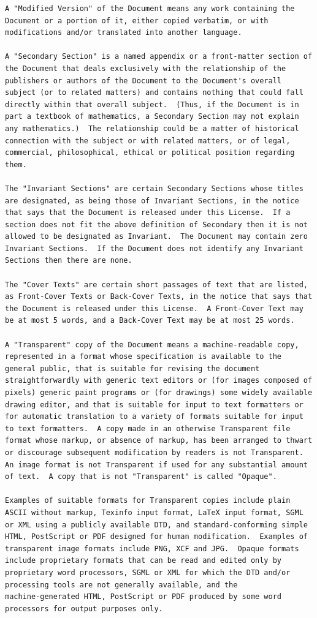 \documentclass[a4paper]{report}
\begin{document}
\begin{verbatim}
A "Modified Version" of the Document means any work containing the
Document or a portion of it, either copied verbatim, or with
modifications and/or translated into another language.

A "Secondary Section" is a named appendix or a front-matter section of
the Document that deals exclusively with the relationship of the
publishers or authors of the Document to the Document's overall
subject (or to related matters) and contains nothing that could fall
directly within that overall subject.  (Thus, if the Document is in
part a textbook of mathematics, a Secondary Section may not explain
any mathematics.)  The relationship could be a matter of historical
connection with the subject or with related matters, or of legal,
commercial, philosophical, ethical or political position regarding
them.

The "Invariant Sections" are certain Secondary Sections whose titles
are designated, as being those of Invariant Sections, in the notice
that says that the Document is released under this License.  If a
section does not fit the above definition of Secondary then it is not
allowed to be designated as Invariant.  The Document may contain zero
Invariant Sections.  If the Document does not identify any Invariant
Sections then there are none.

The "Cover Texts" are certain short passages of text that are listed,
as Front-Cover Texts or Back-Cover Texts, in the notice that says that
the Document is released under this License.  A Front-Cover Text may
be at most 5 words, and a Back-Cover Text may be at most 25 words.

A "Transparent" copy of the Document means a machine-readable copy,
represented in a format whose specification is available to the
general public, that is suitable for revising the document
straightforwardly with generic text editors or (for images composed of
pixels) generic paint programs or (for drawings) some widely available
drawing editor, and that is suitable for input to text formatters or
for automatic translation to a variety of formats suitable for input
to text formatters.  A copy made in an otherwise Transparent file
format whose markup, or absence of markup, has been arranged to thwart
or discourage subsequent modification by readers is not Transparent.
An image format is not Transparent if used for any substantial amount
of text.  A copy that is not "Transparent" is called "Opaque".

Examples of suitable formats for Transparent copies include plain
ASCII without markup, Texinfo input format, LaTeX input format, SGML
or XML using a publicly available DTD, and standard-conforming simple
HTML, PostScript or PDF designed for human modification.  Examples of
transparent image formats include PNG, XCF and JPG.  Opaque formats
include proprietary formats that can be read and edited only by
proprietary word processors, SGML or XML for which the DTD and/or
processing tools are not generally available, and the
machine-generated HTML, PostScript or PDF produced by some word
processors for output purposes only.


\end{verbatim}
\end{document}
